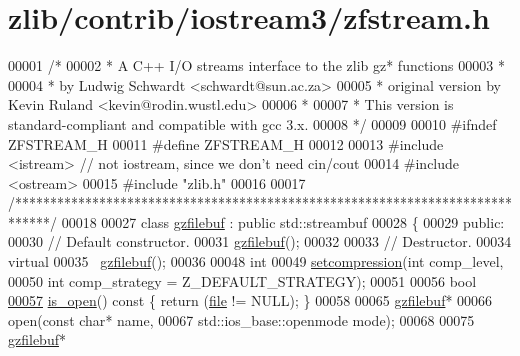 \hypertarget{zlib_2contrib_2iostream3_2zfstream_8h_source}{}\section{zlib/contrib/iostream3/zfstream.h}
\label{zlib_2contrib_2iostream3_2zfstream_8h_source}

\begin{DoxyCode}
00001 \textcolor{comment}{/*}
00002 \textcolor{comment}{ * A C++ I/O streams interface to the zlib gz* functions}
00003 \textcolor{comment}{ *}
00004 \textcolor{comment}{ * by Ludwig Schwardt <schwardt@sun.ac.za>}
00005 \textcolor{comment}{ * original version by Kevin Ruland <kevin@rodin.wustl.edu>}
00006 \textcolor{comment}{ *}
00007 \textcolor{comment}{ * This version is standard-compliant and compatible with gcc 3.x.}
00008 \textcolor{comment}{ */}
00009 
00010 \textcolor{preprocessor}{#ifndef ZFSTREAM\_H}
00011 \textcolor{preprocessor}{#define ZFSTREAM\_H}
00012 
00013 \textcolor{preprocessor}{#include <istream>}  \textcolor{comment}{// not iostream, since we don't need cin/cout}
00014 \textcolor{preprocessor}{#include <ostream>}
00015 \textcolor{preprocessor}{#include "zlib.h"}
00016 
00017 \textcolor{comment}{/*****************************************************************************/}
00018 
00027 \textcolor{keyword}{class }\hyperlink{classgzfilebuf}{gzfilebuf} : \textcolor{keyword}{public} std::streambuf
00028 \{
00029 \textcolor{keyword}{public}:
00030   \textcolor{comment}{//  Default constructor.}
00031   \hyperlink{classgzfilebuf}{gzfilebuf}();
00032 
00033   \textcolor{comment}{//  Destructor.}
00034   \textcolor{keyword}{virtual}
00035   ~\hyperlink{classgzfilebuf}{gzfilebuf}();
00036 
00048   \textcolor{keywordtype}{int}
00049   \hyperlink{classgzfilebuf_ad109ea4fc4ca7cc19d8014b53375255d}{setcompression}(\textcolor{keywordtype}{int} comp\_level,
00050                  \textcolor{keywordtype}{int} comp\_strategy = Z\_DEFAULT\_STRATEGY);
00051 
00056   \textcolor{keywordtype}{bool}
\hyperlink{classgzfilebuf_a24dfb3e35c147aaf3a562c1ea4268757}{00057}   \hyperlink{classgzfilebuf_a24dfb3e35c147aaf3a562c1ea4268757}{is\_open}()\textcolor{keyword}{ const }\{ \textcolor{keywordflow}{return} (\hyperlink{structfile}{file} != NULL); \}
00058 
00065   \hyperlink{classgzfilebuf}{gzfilebuf}*
00066   open(\textcolor{keyword}{const} \textcolor{keywordtype}{char}* name,
00067        std::ios\_base::openmode mode);
00068 
00075   \hyperlink{classgzfilebuf}{gzfilebuf}*

\end{DoxyCode}
